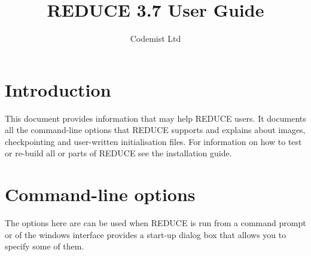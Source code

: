 \documentclass[a4paper,11pt]{article}
\title{REDUCE 3.7 User Guide}
\author{Codemist Ltd}
\begin{document}
\maketitle
\section{Introduction}
This document provides information that may help REDUCE users. It documents
all the command-line options that REDUCE supports and explains about
images, checkpointing and user-written initialisation files. For information
on how to test or re-build all or parts of REDUCE see the installation guide.

\section{Command-line options}
The options here are can be used when REDUCE is run from a command prompt
or of the windows interface provides a start-up dialog box that allows you
to specify some of them.
\end{document}
